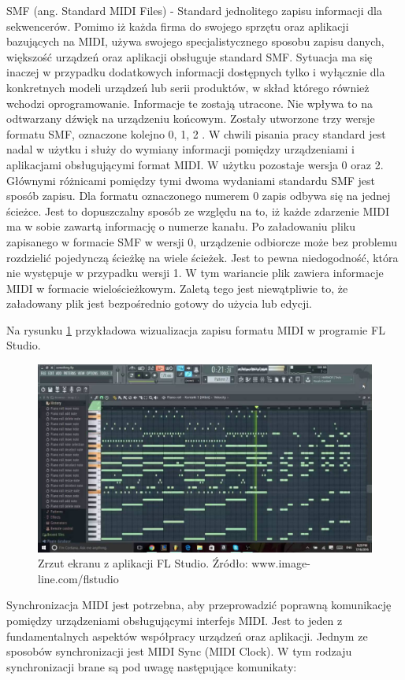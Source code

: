 SMF (ang. Standard MIDI Files) - Standard jednolitego zapisu informacji dla sekwencerów. Pomimo iż każda firma do swojego sprzętu oraz aplikacji bazujących na MIDI, używa swojego specjalistycznego sposobu zapisu danych, większość urządzeń oraz aplikacji obsługuje standard SMF. Sytuacja ma się inaczej w przypadku dodatkowych informacji dostępnych tylko i wyłącznie dla konkretnych modeli urządzeń lub serii produktów, w skład którego również wchodzi oprogramowanie. Informacje te zostają utracone. Nie wpływa to na odtwarzany dźwięk na urządzeniu końcowym.
Zostały utworzone trzy wersje formatu SMF, oznaczone kolejno 0, 1, 2 . W chwili pisania pracy standard jest nadal w użytku i służy do wymiany informacji pomiędzy urządzeniami i  aplikacjami obsługującymi format MIDI. W użytku pozostaje wersja 0 oraz 2. Głównymi różnicami pomiędzy tymi dwoma wydaniami standardu SMF jest sposób zapisu. Dla formatu oznaczonego numerem 0 zapis odbywa się na jednej ścieżce. Jest to dopuszczalny sposób ze względu na to, iż każde zdarzenie MIDI ma w sobie zawartą informację o numerze kanału. Po załadowaniu pliku zapisanego w formacie SMF w wersji 0, urządzenie odbiorcze może bez problemu rozdzielić pojedynczą ścieżkę na wiele ścieżek. Jest to pewna niedogodność, która nie występuje w przypadku wersji 1. W tym wariancie plik zawiera informacje MIDI w formacie wielościeżkowym. Zaletą tego jest niewątpliwie to, że załadowany plik jest bezpośrednio gotowy do użycia lub edycji.


Na rysunku \ref{midiWizual} przykładowa wizualizacja zapisu formatu MIDI w programie FL Studio.

\begin{figure}[h!]
  \centering
  \includegraphics[width=0.5\linewidth]{rys/fl1}
  \caption{Zrzut ekranu z aplikacji FL Studio. Źródło: www.image-line.com/flstudio}
  \label{midiWizual}
\end{figure}


Synchronizacja MIDI jest potrzebna, aby przeprowadzić poprawną komunikację pomiędzy urządzeniami obsługującymi interfejs MIDI. Jest to jeden z fundamentalnych aspektów współpracy urządzeń oraz aplikacji. Jednym ze sposobów synchronizacji jest MIDI Sync (MIDI Clock). W tym rodzaju synchronizacji brane są pod uwagę następujące komunikaty:


